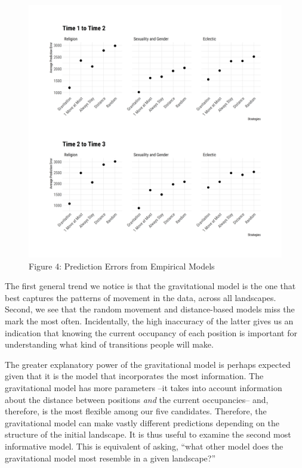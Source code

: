 \documentclass[
  11pt,
]{article}
\begin{document}
\begin{figure}[htp]
\begin{center}
\caption*{Figure 4: Prediction Errors from Empirical Models}

\begin{center}\includegraphics[width=1\linewidth]{../figures/figure_4} \end{center}

\end{center}
\end{figure}

The first general trend we notice is that the gravitational model is the
one that best captures the patterns of movement in the data, across all
landscapes. Second, we see that the random movement and distance-based
models miss the mark the most often. Incidentally, the high inaccuracy
of the latter gives us an indication that knowing the current occupancy
of each position is important for understanding what kind of transitions
people will make.

The greater explanatory power of the gravitational model is perhaps
expected given that it is the model that incorporates the most
information. The gravitational model has more parameters --it takes into
account information about the distance between positions \emph{and} the
current occupancies-- and, therefore, is the most flexible among our
five candidates. Therefore, the gravitational model can make vastly
different predictions depending on the structure of the initial
landscape. It is thus useful to examine the second most informative
model. This is equivalent of asking, ``what other model does the
gravitational model most resemble in a given landscape?''
\end{document}
